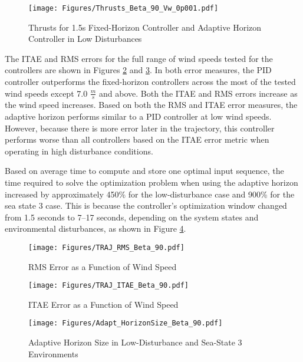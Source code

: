 \documentclass[letterpaper, 10 pt, conference]{ieeeconf}  %
\begin{document}
\begin{figure}[b]
  \centering
  \texttt{[image: Figures/Thrusts\_Beta\_90\_Vw\_0p001.pdf]}
  \caption{Thrusts for 1.5s Fixed-Horizon Controller and Adaptive Horizon Controller in Low Disturbances}
  \label{fig:thrust}
\end{figure}

The ITAE and RMS errors for the full range of wind speeds tested for the controllers are shown in Figures \ref{fig:RMS} and \ref{fig:ITAE}. In both error measures, the PID controller outperforms the fixed-horizon controllers across the most of the tested wind speeds except 7.0 $\frac{m}{s}$ and above. Both the ITAE and RMS errors increase as the wind speed increases. Based on both the RMS and ITAE error measures, the adaptive horizon performs similar to a PID controller at low wind speeds. However, because there is more error later in the trajectory, this controller performs worse than all controllers based on the ITAE error metric when operating in high disturbance conditions.

Based on average time to compute and store one optimal input sequence, the time required to solve the optimization problem when using the adaptive horizon increased by approximately 450\% for the low-disturbance case and 900\% for the sea state 3 case. This is because the controller's optimization window changed from 1.5 seconds to 7--17 seconds, depending on the system states and environmental disturbances, as shown in Figure \ref{fig:HOT}. 
\begin{figure}[tb]
  \centering
  \texttt{[image: Figures/TRAJ\_RMS\_Beta\_90.pdf]}
  \caption{RMS Error as a Function of Wind Speed}
  \label{fig:RMS}
\end{figure}
\begin{figure}[tb]
  \centering
  \texttt{[image: Figures/TRAJ\_ITAE\_Beta\_90.pdf]}
  \caption{ITAE Error as a Function of Wind Speed}
  \label{fig:ITAE}
\end{figure}
\begin{figure}[tb]
  \centering
  \texttt{[image: Figures/Adapt\_HorizonSize\_Beta\_90.pdf]}
  \caption{Adaptive Horizon Size in Low-Disturbance and Sea-State 3 Environments}
  \label{fig:HOT}
\end{figure}
\end{document}
